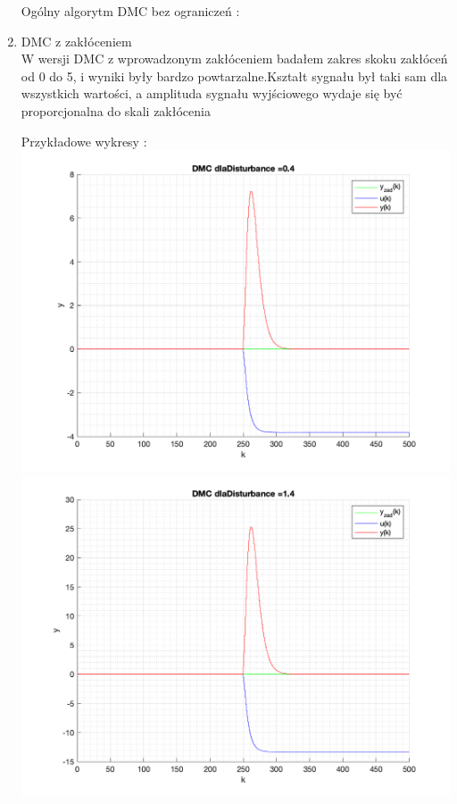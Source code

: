 \documentclass[a4paper, 11pt]{article}
\begin{document}
\begin{enumerate}
Ogólny algorytm DMC bez ograniczeń : \\
  
\newpage
\item DMC z zakłóceniem\\
W wersji DMC z wprowadzonym zakłóceniem badałem zakres skoku zakłóceń od 0 do 5, i wyniki były bardzo powtarzalne.Kształt sygnału był taki sam dla wszystkich wartości, a amplituda sygnału wyjściowego wydaje się być proporcjonalna do skali zakłócenia
 
Przykładowe wykresy :\\
 \includegraphics[width=\linewidth]{./ModelsP4_Disturbance/P4_DMC_Disturbance_0_4_png.png} 
  \includegraphics[width=\linewidth]{./ModelsP4_Disturbance/P4_DMC_Disturbance_1_4_png.png} 

\end{enumerate}
\end{document}
